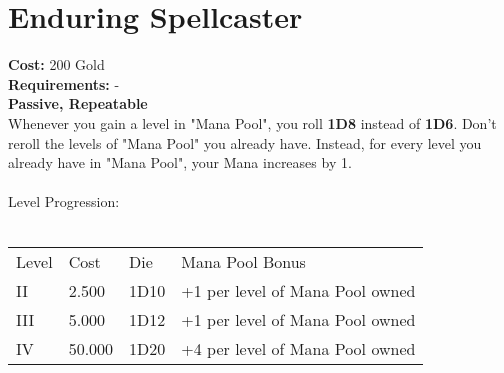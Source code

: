 \section{Enduring Spellcaster}\label{sec:enduringspellcaster}
\textbf{Cost:} 200 Gold\\
\textbf{Requirements:} -\\
\textbf{Passive, Repeatable}\\
Whenever you gain a level in "Mana Pool", you roll \textbf{1D8} instead of \textbf{1D6}.
Don't reroll the levels of "Mana Pool" you already have.
Instead, for every level you already have in "Mana Pool", your Mana increases by 1.\\
\\
Level Progression:\\
\\
\begin{tabular}{l | l | l | l}
    Level & Cost & Die & Mana Pool Bonus\\
    II & 2.500 & 1D10 & +1 per level of Mana Pool owned\\
    III & 5.000 & 1D12 & +1 per level of Mana Pool owned\\
    IV & 50.000 & 1D20 & +4 per level of Mana Pool owned\\
\end{tabular}